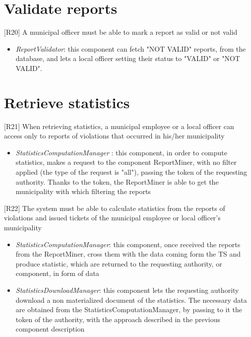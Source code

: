 		\section{Validate reports}
			{[R20]} A municipal officer must be able to mark a report as valid or not valid
				\begin{itemize}
					\item \textit{ReportValidator}: this component can fetch "NOT VALID" reports, from the database, and lets a local officer setting their status to "VALID" or "NOT VALID".
				\end{itemize}
		\section{Retrieve statistics}
			{[R21]} When retrieving statistics, a municipal employee or a local officer can access only to reports of violations that occurred in his/her municipality
				\begin{itemize}
					\item \textit{StatisticsComputationManager} : this component, in order to compute statistics, makes a request to the component ReportMiner, with no filter applied (the type of the request is "all"), passing the token of the requesting authority. Thanks to the token, the ReportMiner is able to get the municipality with which filtering the reports
				\end{itemize}
			{[R22]} The system must be able to calculate statistics from the reports of violations and issued tickets of the municipal employee or local officer's municipality
				\begin{itemize}
					\item \textit{StatisticsComputationManager}: this component, once received the reports from the ReportMiner, cross them with the data coming form the TS and produce statistic, which are returned to the requesting authority, or component, in form of data
					\item \textit{StatisticsDownloadManager}: this component lets the requesting authority download a non materialized document of the statistics. The necessary data are obtained from the StatisticsComputationManager, by passing to it the token of the authority, with the approach described in the previous component description
				\end{itemize}
				
